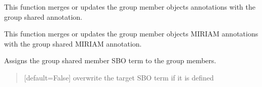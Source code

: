 \documentclass[letterpaper,12pt,english]{sphinxmanual}
\begin{document}
\begin{fulllineitems}
\begin{fulllineitems}
\end{fulllineitems}


\begin{fulllineitems}
\label{\detokenize{api/core:cbmpy.CBModel.Group.assignSharedAnnotationToMembers}}
\pysigstartsignatures
\pysiglinewithargsret
{}
{}
{}
\pysigstopsignatures
\sphinxAtStartPar
This function merges or updates the group member objects annotations with the
group shared annotation.

\end{fulllineitems}


\begin{fulllineitems}
\label{\detokenize{api/core:cbmpy.CBModel.Group.assignSharedMIRIAMannotationToMembers}}
\pysigstartsignatures
\pysiglinewithargsret
{}
{}
{}
\pysigstopsignatures
\sphinxAtStartPar
This function merges or updates the group member objects MIRIAM annotations
with the group shared MIRIAM annotation.

\end{fulllineitems}


\begin{fulllineitems}
\label{\detokenize{api/core:cbmpy.CBModel.Group.assignSharedSBOtermsToMembers}}
\pysigstartsignatures
\pysiglinewithargsret
{}
{}
{}
\pysigstopsignatures
\sphinxAtStartPar
Assigns the group shared member SBO term to the group members.
\begin{quote}\begin{description}
\sphinxAtStartPar
{} \textendash{} {[}default=False{]} overwrite the target SBO term if it is defined


\end{description}
\end{quote}
\end{fulllineitems}
\end{fulllineitems}
\end{document}
